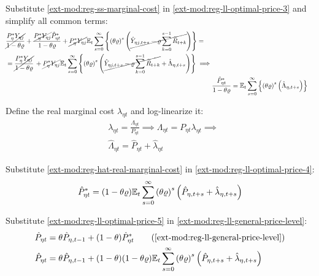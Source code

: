 \documentclass[../thesis.tex]{subfiles}
\begin{document}
Substitute \ref{ext-mod:reg-ss-marginal-cost} in \ref{ext-mod:reg-ll-optimal-price-3} and simplify all common terms:
\begin{align}
	\begin{split}
		& \cancel{\frac{P_{\eta}^{\ast} Y_{\eta j}}{1-\theta\varrho}} + \frac{ \cancel{P_{\eta}^{\ast} Y_{\eta j}} \hat{P}_{\eta t}^{\ast}}{1- \theta \varrho} + \cancel{P_{\eta}^{\ast} Y_{\eta j}} {\mathbb{E}_{t}} \sum_{s=0}^{\infty} \left\{ \left( \theta \varrho \right)^s \left( \cancel{\hat{Y}_{\eta j, t+s} - \varrho \sum_{k=0}^{s-1} \widetilde{R}_{t+k}} \right) \right\} = 
		\\
		& = \cancel{\frac{P_{\eta}^{\ast} Y_{\eta j}}{1-\theta\varrho}} \, + \cancel{P_{\eta}^{\ast} Y_{\eta j}} {\mathbb{E}_{t}} \sum_{s=0}^{\infty} \left\{ \left( \theta \varrho \right)^s \left( \cancel{\hat{Y}_{\eta j, t+s} - \varrho \sum_{k=0}^{s-1} \widetilde{R}_{t+k}} + \hat{\Lambda}_{\eta, t+s} \right) \right\} \implies	
	\end{split} \nonumber \\
	& \frac{ \hat{P}_{\eta t}^{\ast}}{1- \theta \varrho} = {\mathbb{E}_{t}} \sum_{s=0}^{\infty} \left\{ \left( \theta \varrho \right)^s \left( \hat{\Lambda}_{\eta, t+s} \right) \right\} \label{ext-mod:reg-ll-optimal-price-4}
\end{align}

Define the real marginal cost $\lambda_{\eta t}$ and log-linearize it:
\begin{align}
	& \lambda_{\eta t} = \frac{\Lambda_{\eta t}}{P_{\eta t}} \implies \Lambda_{\eta t} = P_{\eta t} \lambda_{\eta t} \implies \label{ext-mod:reg-real-marginal-cost} \\
	& \hat{\Lambda}_{\eta t} = \hat{P}_{\eta t} + \hat{\lambda}_{\eta t} \label{ext-mod:reg-hat-real-marginal-cost}
\end{align}

Substitute \ref{ext-mod:reg-hat-real-marginal-cost} in \ref{ext-mod:reg-ll-optimal-price-4}:
\begin{align}
	\hat{P}_{\eta t}^{\ast} = (1- \theta \varrho) {\mathbb{E}_{t}} \sum_{s=0}^{\infty} \left( \theta \varrho \right)^s \left( \hat{P}_{\eta, t+s} + \hat{\lambda}_{\eta, t+s} \right) \label{ext-mod:reg-ll-optimal-price-5}
\end{align}

Substitute \ref{ext-mod:reg-ll-optimal-price-5} in \ref{ext-mod:reg-ll-general-price-level}:
\begin{align}
	\hat{P}_{\eta t} &= \theta \hat{P}_{\eta, t-1} + (1-\theta) \hat{P}_{\eta t}^{\ast} \tag{\ref{ext-mod:reg-ll-general-price-level}}\\
	\hat{P}_{\eta t} &= \theta \hat{P}_{\eta, t-1} + (1-\theta) (1- \theta \varrho) \E \sum_{s=0}^{\infty} \left( \theta \varrho \right)^s \left( \hat{P}_{\eta, t+s} + \hat{\lambda}_{\eta, t+s} \right) \label{ext-mod:reg-ll-general-price-level-2}
\end{align}
\end{document}
